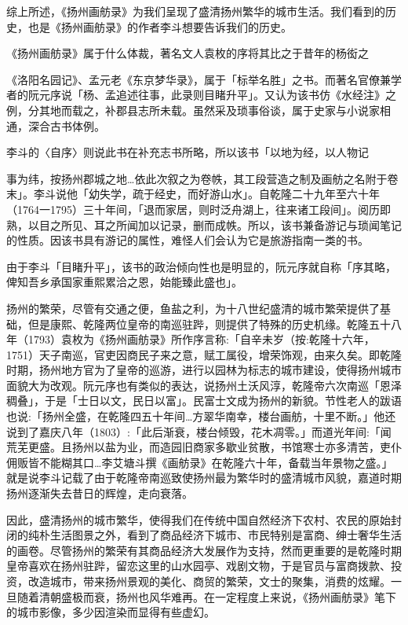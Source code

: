 综上所述，《扬州画舫录》为我们呈现了盛清扬州繁华的城市生活。我们看到的历史，也是《扬州画舫录》的作者李斗想要告诉我们的历史。

\begin{BookQuote}
《扬州画舫录》属于什么体裁，著名文人袁枚的序将其比之于昔年的杨衒之
\end{BookQuote}

《洛阳名园记》、孟元老《东京梦华录》，属于「标举名胜」之书。而著名官僚兼学者的阮元序说「杨、孟追述往事，此录则目睹升平」。又认为该书仿《水经注》之例，分其地而载之，补郡县志所未载。虽然采及琐事俗谈，属于史家与小说家相通，深合古书体例。

李斗的〈自序〉则说此书在补充志书所略，所以该书「以地为经，以人物记


\noindent 事为纬，按扬州郡城之地…依此次叙之为卷帙，其工段营造之制及画舫之名附于卷末」。李斗说他「幼失学，疏于经史，而好游山水」。自乾隆二十九年至六十年（1764一1795）三十年间，「退而家居，则时泛舟湖上，往来诸工段间」。阅历即熟，以目之所见、耳之所闻加以记录，删而成帙。所以，该书兼备游记与琐闻笔记的性质。因该书具有游记的属性，难怪人们会认为它是旅游指南一类的书。

由于李斗「目睹升平」，该书的政治倾向性也是明显的，阮元序就自称「序其略，俾知吾乡承国家重熙累洽之恩，始能臻此盛也」。

扬州的繁荣，尽管有交通之便，鱼盐之利，为十八世纪盛清的城市繁荣提供了基础，但是康熙、乾隆两位皇帝的南巡驻跸，则提供了特殊的历史机缘。乾隆五十八年（1793）袁枚为《扬州画舫录》所作序言称:「自辛未岁（按:乾隆十六年，1751）天子南巡，官吏因商民子来之意，赋工属役，增荣饰观，由来久矣。即乾隆时期，扬州地方官为了皇帝的巡游，进行以园林为标志的城市建设，使得扬州城市面貌大为改观。阮元序也有类似的表达，说扬州土沃风淳，乾隆帝六次南巡「恩泽稠叠」，于是「士日以文，民日以富」。民富士文成为扬州的新貌。节性老人的跋语也说:「扬州全盛，在乾隆四五十年间…方翠华南幸，楼台画舫，十里不断。」他还说到了嘉庆八年（1803）:「此后渐衰，楼台倾毁，花木凋零。」而道光年间:「闻荒芜更盛。且扬州以盐为业，而造园旧商家多歇业贫散，书馆寒士亦多清苦，吏仆佣贩皆不能糊其口…李艾塘斗撰《画舫录》在乾隆六十年，备载当年景物之盛。」就是说李斗记载了由于乾隆帝南巡致使扬州最为繁华时的盛清城市风貌，嘉道时期扬州逐渐失去昔日的辉煌，走向衰落。

因此，盛清扬州的城市繁华，使得我们在传统中国自然经济下农村、农民的原始封闭的纯朴生活图景之外，看到了商品经济下城市、市民特别是富商、绅士奢华生活的画卷。尽管扬州的繁荣有其商品经济大发展作为支持，然而更重要的是乾隆时期皇帝喜欢在扬州驻跸，留恋这里的山水园亭、戏剧文物，于是官员与富商拨款、投资，改造城市，带来扬州景观的美化、商贸的繁荣，文士的聚集，消费的炫耀。一旦随着清朝盛极而衰，扬州也风华难再。在一定程度上来说，《扬州画舫录》笔下的城市影像，多少因渲染而显得有些虚幻。

